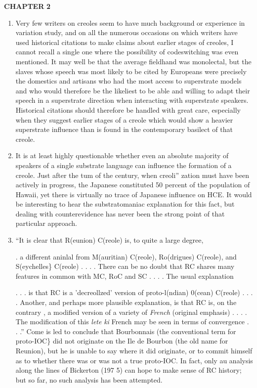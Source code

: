 \textbf{CHAPTER} \textbf{2}


\begin{enumerate} 
\item Very few writers on creoles seem to have much background or experience in variation study, and on all the numerous occasions on which writers have used historical citations to make claims about earlier stages of creoles, I cannot recall a single one where the possi\-bility of codeswitching was even mentioned. It may well be that the average fieldhand was monolectal, but the slaves whose speech was most likely to be cited by Europeans were precisely the domestics and artisans who had the most access to superstrate models and who would therefore be the likeliest to be able and willing to adapt their speech in a superstrate direction when interacting with superstrate speakers. Historical citations should therefore be handled with great care, especially when they suggest earlier stages of a creole which would show a heavier superstrate influence than is found in the con\-temporary basilect of that creole.
 
\item It is at least highly questionable whether even an absolute majority of speakers of a single substrate language can influence the formation of a creole. Just after the tum of the century, when creoli'' zation must have been actively in progress, the Japanese constituted 50 percent of the population of Hawaii, yet there is virtually no trace of Japanese influence on HCE. It would be interesting to hear the substratomaniac explanation for this fact, but dealing with counter\-evidence has never been the strong point of that particular approach.
\item ``It is clear that R(eunion) C(reole) is, to quite a large degree,


. a different aninlal from M(auritian) C(reole), Ro(drigues) C(reole), and S(eychelles\} C(reole) . . . . There can be no doubt that RC shares many features in common with MC, RoC and SC . . . . The usual explanation

. . . is that RC is a 'decreollzed' version of proto-l(ndian) 0(cean) C(reole) . . . . Another, and perhaps more plausible explanation, is that RC is, on the contrary , a modified version of a variety of \textit{French} (original emphasis) . . . . The modification of this \textit{lete} \textit{ki} French may be seen in terms of convergence . . .'' Come is led to conclude that Bourbonnais (the conventional term for proto-IOC\} did not originate on the Ile de Bourbon (the old name for Reunion), but he is unable
to say where it did originate, or to commit himself as to whether there was or was not a true proto-IOC. In fact, only au analysis along the lines of Bickerton (197 5) can hope to make sense of RC history; but so far, no such analysis has been attempted.


\end{enumerate}

